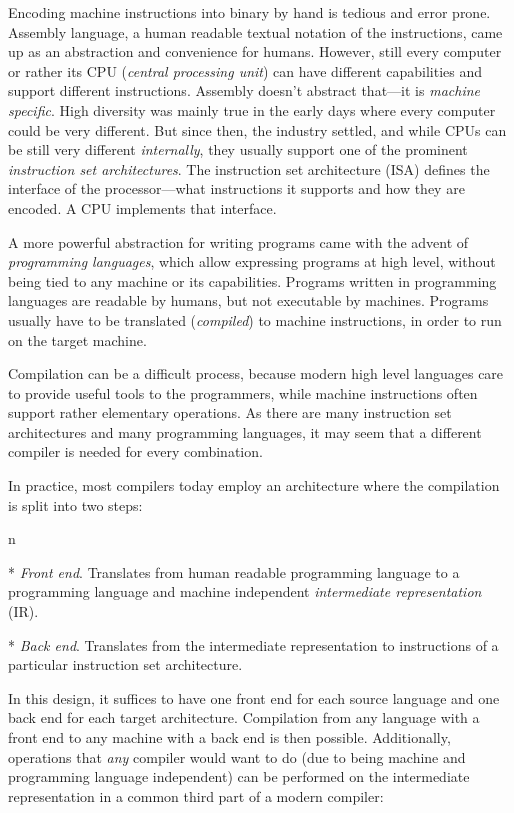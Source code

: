 Encoding machine instructions into binary by hand is tedious and error prone.
Assembly language, a human readable textual notation of the instructions, came up
as an abstraction and convenience for humans.
However, still every computer or rather its CPU ({\em central processing unit})
can have different capabilities and support different instructions. Assembly
doesn't abstract that---it is {\em machine specific}. High
diversity was mainly true in the early days where every computer could be
very different. But since then, the industry settled, and while CPUs can be still
very different {\em internally}, they usually support one of the prominent {\em
instruction set architectures}. The instruction set architecture (ISA) defines
the interface of the processor---what instructions it supports and how they are
encoded. A CPU implements that interface.

A more powerful abstraction for writing programs came with the advent of {\em
programming languages}, which allow expressing programs at high level, without
being tied to any machine or its capabilities. Programs written in programming
languages are readable by humans, but not executable by machines. Programs
usually have to be translated ({\em compiled}) to machine instructions, in order
to run on the target machine.

Compilation can be a difficult process, because modern high level languages care to
provide useful tools to the programmers, while machine instructions often
support rather elementary operations. As there are many instruction set
architectures and many programming languages, it may seem that a different
compiler is needed for every combination.

In practice, most compilers today employ an architecture where the compilation
is split into two steps:

\begitems \style n

* {\em Front end}. Translates from human readable programming language to a
programming language and machine independent {\em intermediate representation}
(IR).

* {\em Back end}. Translates from the intermediate representation to instructions of
a particular instruction set architecture.

\enditems
%
In this design, it suffices to have one front end for each source language
and one back end for each target architecture. Compilation from any language
with a front end to any machine with a back end is then possible.
Additionally, operations that {\em any} compiler would want to do (due to being
machine and programming language independent) can be performed on the
intermediate representation in a common third part of a modern compiler:

